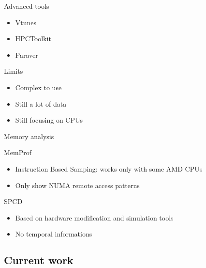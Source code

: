 \documentclass[xcolor={usenames,dvipsnames}]{beamer}
\newcommand{\subsectiontitle}{}
\newcommand{\newsubsection}[1]{\renewcommand{\subsectiontitle}{#1}\subsection{#1}}
\begin{document}
\begin{frame}{Advanced tools}
    \begin{itemize}
        \item Vtunes \cite{Reinders05VTune}
        \item HPCToolkit \cite{Adhianto10HPCTOOLKIT}
        \item Paraver \cite{Pillet95PARAVER}
    \end{itemize}
    \pause
    \begin{alertblock}{Limits}
        \begin{itemize}
            \item Complex to use
            \item Still a lot of data
            \item Still focusing on CPUs
        \end{itemize}
    \end{alertblock}
\end{frame}

\begin{frame}{Memory analysis}
    \begin{block}{MemProf \cite{Lachaize12MemProf}}
        \begin{itemize}
            \item Instruction Based Samping: works only with some AMD CPUs
            \item Only show NUMA remote access patterns
        \end{itemize}
    \end{block}
    \pause
    \begin{block}{SPCD \cite{Cruz12Using,Cruz12Using,Cruz14Dynamic} }
        \begin{itemize}
            \item Based on hardware modification and simulation tools
            \item No temporal informations
        \end{itemize}
    \end{block}
\end{frame}

\newsubsection{Current work}
\end{document}

